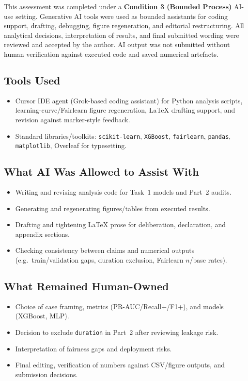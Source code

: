 \documentclass[11pt,a4paper]{article}
\begin{document}
This assessment was completed under a \textbf{Condition 3 (Bounded Process)} AI-use
setting. Generative AI tools were used as bounded assistants for coding support,
drafting, debugging, figure regeneration, and editorial restructuring. All analytical
decisions, interpretation of results, and final submitted wording were reviewed and
accepted by the author. AI output was not submitted without human verification against
executed code and saved numerical artefacts.

\subsection{Tools Used}
\begin{itemize}
    \item Cursor IDE agent (Grok-based coding assistant) for Python analysis scripts,
    learning-curve/Fairlearn figure regeneration, LaTeX drafting support, and revision
    against marker-style feedback.
    \item Standard libraries/toolkits: \texttt{scikit-learn}, \texttt{XGBoost},
    \texttt{fairlearn}, \texttt{pandas}, \texttt{matplotlib}, Overleaf for typesetting.
\end{itemize}

\subsection{What AI Was Allowed to Assist With}
\begin{itemize}
    \item Writing and revising analysis code for Task~1 models and Part~2 audits.
    \item Generating and regenerating figures/tables from executed results.
    \item Drafting and tightening LaTeX prose for deliberation, declaration, and
    appendix sections.
    \item Checking consistency between claims and numerical outputs (e.g.\ train/validation
    gaps, duration exclusion, Fairlearn $n$/base rates).
\end{itemize}

\subsection{What Remained Human-Owned}
\begin{itemize}
    \item Choice of case framing, metrics (PR-AUC/Recall+/F1+), and models (XGBoost, MLP).
    \item Decision to exclude \texttt{duration} in Part~2 after reviewing leakage risk.
    \item Interpretation of fairness gaps and deployment risks.
    \item Final editing, verification of numbers against CSV/figure outputs, and
    submission decisions.
\end{itemize}
\end{document}
